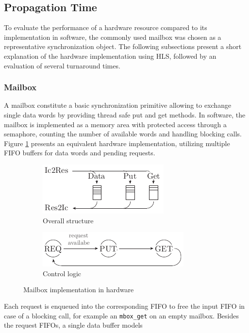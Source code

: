 \subsection{Propagation Time}
To evaluate the performance of a hardware resource compared to its
implementation in software, the commonly used mailbox was chosen as a
representative synchronization object. The following subsections present a
short explanation of the hardware implementation using \ac{HLS}, followed by
an evaluation of several turnaround times.
\subsubsection{Mailbox}
A mailbox constitute a basic synchronization primitive allowing to exchange
single data words by providing thread safe put and get methods. In software,
the mailbox is implemented as a memory area with protected access through a
semaphore, counting the number of available words and handling blocking calls.
Figure \ref{fig:mbox_hw_struct} presents an equivalent hardware
implementation, utilizing multiple \ac{FIFO} buffers for data words and
pending requests.
\begin{figure}
	\centering
	\begin{subfigure}{0.49\textwidth}
		\centering
		\includegraphics{../figures/mbox_hw_struct}
		\caption{Overall structure}
		\label{fig:mbox_hw_struct}
	\end{subfigure}
	\begin{subfigure}{0.49\textwidth}
		\centering
		\includegraphics{../figures/mbox_hw_fsm}
		\caption{Control logic}
		\label{fig:mbox_hw_fsm}
	\end{subfigure}
	\caption{Mailbox implementation in hardware}
	\label{fig:mbox_hw}
\end{figure}
Each request is enqueued into the corresponding \ac{FIFO} to free the input
\ac{FIFO} in case of a blocking call, for example an \lstinline{mbox_get} on
an empty mailbox. Besides the request \acp{FIFO}, a single data buffer models
